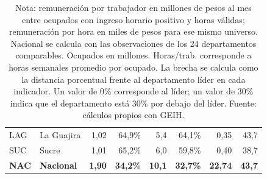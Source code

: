 \begin{table}[H]
\begin{tabular}{@{}llrrrrrr@{}}
LAG & La Guajira & 1,02 & 64,9\% & 5,4 & 64,1\% & 0,35 & 43,7 \\
SUC & Sucre & 1,01 & 65,2\% & 6,0 & 59,8\% & 0,40 & 38,7 \\
\midrule
\textbf{NAC} & \textbf{Nacional} & \textbf{1,90} & \textbf{34,2\%} & \textbf{10,1} & \textbf{32,7\%} & \textbf{22,74} & \textbf{43,7} \\
\bottomrule
\end{tabular}
\caption*{\footnotesize Nota: remuneración por trabajador en millones de pesos al mes entre ocupados con ingreso horario positivo y horas válidas; remuneración por hora en miles de pesos para ese mismo universo. Nacional se calcula con las observaciones de los 24 departamentos comparables. Ocupados en millones. Horas/trab. corresponde a horas semanales promedio por ocupado. La brecha se calcula como la distancia porcentual frente al departamento líder en cada indicador. Un valor de 0\% corresponde al líder; un valor de 30\% indica que el departamento está 30\% por debajo del líder. Fuente: cálculos propios con GEIH.}
\end{table}